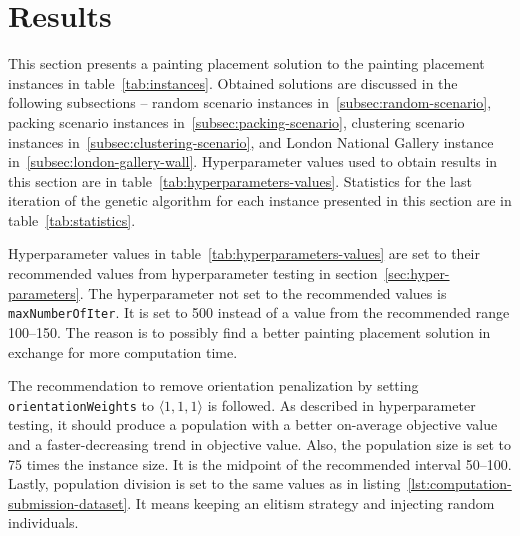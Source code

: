 \clearpage
\newpage


\section{Results}\label{sec:results}
This section presents a painting placement solution to the painting placement instances in table~\ref{tab:instances}.
Obtained solutions are discussed in the following subsections –
random scenario instances in~\ref{subsec:random-scenario},
packing scenario instances in~\ref{subsec:packing-scenario},
clustering scenario instances in~\ref{subsec:clustering-scenario},
and London National Gallery instance in~\ref{subsec:london-gallery-wall}.
Hyperparameter values used to obtain results in this section are in table~\ref{tab:hyperparameters-values}.
Statistics for the last iteration of the genetic algorithm for each instance presented in this section are in table~\ref{tab:statistics}.

Hyperparameter values in table~\ref{tab:hyperparameters-values} are set to their recommended values
from hyperparameter testing in section~\ref{sec:hyper-parameters}.
The hyperparameter not set to the recommended values is \verb|maxNumberOfIter|.
It is set to 500 instead of a value from the recommended range \numrange{100}{150}.
The reason is to possibly find a better painting placement solution in exchange for more computation time.

The recommendation to remove orientation penalization by setting \verb|orientationWeights| to $\langle 1,1,1\rangle$ is followed.
As described in hyperparameter testing, it should produce a population with a better on-average objective value and a faster-decreasing trend in objective value.
Also, the population size is set to 75 times the instance size.
It is the midpoint of the recommended interval \numrange{50}{100}.
Lastly, population division is set to the same values as in listing~\ref{lst:computation-submission-dataset}.
It means keeping an elitism strategy and injecting random individuals.


